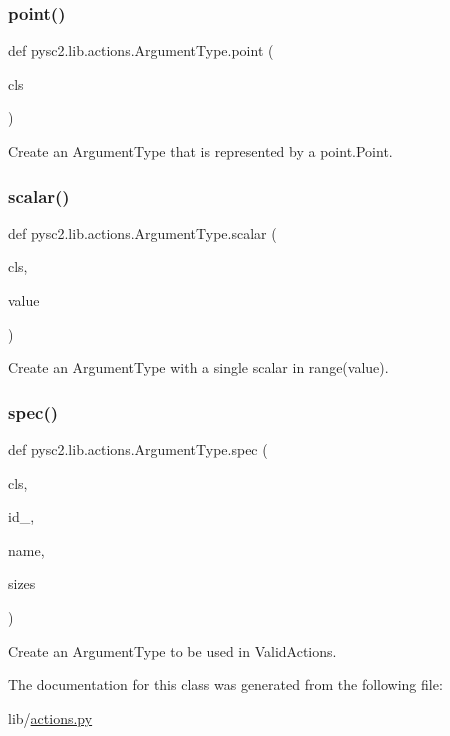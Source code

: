 \subsubsection{\texorpdfstring{point()}{point()}}
{\footnotesize\ttfamily def pysc2.\+lib.\+actions.\+Argument\+Type.\+point (\begin{DoxyParamCaption}\item[{}]{cls }\end{DoxyParamCaption})}

\begin{DoxyVerb}Create an ArgumentType that is represented by a point.Point.\end{DoxyVerb}
 \mbox{\label{classpysc2_1_1lib_1_1actions_1_1_argument_type_a6440b4d3ca6308d338405b4dd456abab}} 
\subsubsection{\texorpdfstring{scalar()}{scalar()}}
{\footnotesize\ttfamily def pysc2.\+lib.\+actions.\+Argument\+Type.\+scalar (\begin{DoxyParamCaption}\item[{}]{cls,  }\item[{}]{value }\end{DoxyParamCaption})}

\begin{DoxyVerb}Create an ArgumentType with a single scalar in range(value).\end{DoxyVerb}
 \mbox{\label{classpysc2_1_1lib_1_1actions_1_1_argument_type_abeda01e4e7ab3656447b9b4af4ed26d3}} 
\subsubsection{\texorpdfstring{spec()}{spec()}}
{\footnotesize\ttfamily def pysc2.\+lib.\+actions.\+Argument\+Type.\+spec (\begin{DoxyParamCaption}\item[{}]{cls,  }\item[{}]{id\+\_\+,  }\item[{}]{name,  }\item[{}]{sizes }\end{DoxyParamCaption})}

\begin{DoxyVerb}Create an ArgumentType to be used in ValidActions.\end{DoxyVerb}
 

The documentation for this class was generated from the following file\+:\begin{DoxyCompactItemize}
\item 
lib/\mbox{\hyperlink{actions_8py}{actions.\+py}}\end{DoxyCompactItemize}
